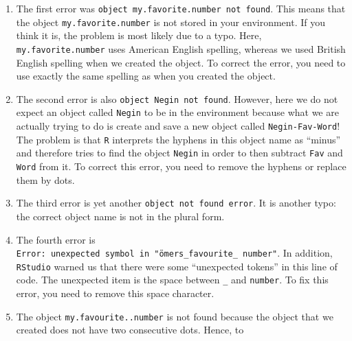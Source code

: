\documentclass[
  letterpaper,
  DIV=11,
  numbers=noendperiod,
  oneside]{scrreprt}
\begin{document}
\begin{tcolorbox}[enhanced jigsaw, colbacktitle=quarto-callout-note-color!10!white, colback=white, breakable, colframe=quarto-callout-note-color-frame, coltitle=black, rightrule=.15mm, left=2mm, leftrule=.75mm, bottomrule=.15mm, titlerule=0mm, toptitle=1mm, arc=.35mm, title=\textcolor{quarto-callout-note-color}{\faInfo}\hspace{0.5em}{Click here for the solutions}, opacitybacktitle=0.6, bottomtitle=1mm, toprule=.15mm, opacityback=0]

\begin{enumerate}
\def\labelenumi{\arabic{enumi}.}
\item
  The first error was
  \texttt{object\ \textquotesingle{}my.favorite.number\textquotesingle{}\ not\ found}.
  This means that the object \texttt{my.favorite.number} is not stored
  in your environment. If you think it is, the problem is most likely
  due to a typo. Here, \texttt{my.favorite.number} uses American English
  spelling, whereas we used British English spelling when we created the
  object. To correct the error, you need to use exactly the same
  spelling as when you created the object.
\item
  The second error is also
  \texttt{object\ \textquotesingle{}Negin\textquotesingle{}\ not\ found}.
  However, here we do not expect an object called \texttt{Negin} to be
  in the environment because what we are actually trying to do is create
  and save a new object called \texttt{Negin-Fav-Word}! The problem is
  that \texttt{R} interprets the hyphens in this object name as
  ``minus'' and therefore tries to find the object \texttt{Negin} in
  order to then subtract \texttt{Fav} and \texttt{Word} from it. To
  correct this error, you need to remove the hyphens or replace them by
  dots.
\item
  The third error is yet another \texttt{object\ not\ found\ error}. It
  is another typo: the correct object name is not in the plural form.
\item
  The fourth error is
  \texttt{Error:\ unexpected\ symbol\ in\ "ömers\_favourite\_\ number"}.
  In addition, \texttt{RStudio} warned us that there were some
  ``unexpected tokens'' in this line of code. The unexpected item is the
  space between \texttt{\_} and \texttt{number}. To fix this error, you
  need to remove this space character.
\item
  The object \texttt{my.favourite..number} is not found because the
  object that we created does not have two consecutive dots. Hence, to

\end{enumerate}
\end{tcolorbox}
\end{document}
